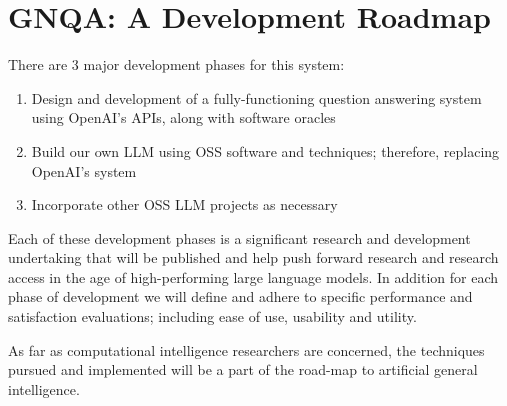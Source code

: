 \section{GNQA: A Development Roadmap}
There are 3 major development phases for this system:
\begin{enumerate}
    \item Design and development of a fully-functioning question answering system using OpenAI's APIs, along with software oracles
    \item Build our own LLM using OSS software and techniques; therefore, replacing OpenAI's system
    \item Incorporate other OSS LLM projects as necessary
\end{enumerate}

Each of these development phases is a significant research and development undertaking that will be published and help push forward research and research access in the age of high-performing large language models.
In addition for each phase of development we will define and adhere to specific performance and satisfaction evaluations; including ease of use, usability and utility.


As far as computational intelligence researchers are concerned, the techniques pursued and implemented will be a part of the road-map to artificial general intelligence.


